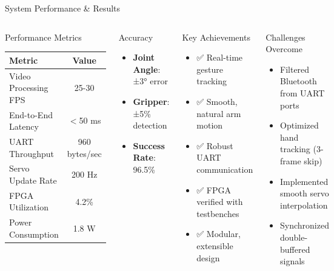 \documentclass[aspectratio=169]{beamer}
\begin{document}
\begin{frame}{System Performance \& Results}
\begin{columns}
\begin{block}{Performance Metrics}
\begin{table}
\tiny
\begin{tabular}{|l|c|}
\hline
\rowcolor{green!30}
\textbf{Metric} & \textbf{Value} \\
\hline
Video Processing FPS & 25-30 \\
\hline
End-to-End Latency & $<$50 ms \\
\hline
UART Throughput & 960 bytes/sec \\
\hline
Servo Update Rate & 200 Hz \\
\hline
FPGA Utilization & 4.2\% \\
\hline
Power Consumption & 1.8 W \\
\hline
\end{tabular}
\end{table}
\end{block}

\begin{block}{Accuracy}
\begin{itemize}
    \item \textbf{Joint Angle}: ±3° error
    \item \textbf{Gripper}: ±5\% detection
    \item \textbf{Success Rate}: 96.5\%
\end{itemize}
\end{block}

\begin{alertblock}{Key Achievements}
\begin{itemize}
    \item ✅ Real-time gesture tracking
    \item ✅ Smooth, natural arm motion
    \item ✅ Robust UART communication
    \item ✅ FPGA verified with testbenches
    \item ✅ Modular, extensible design
\end{itemize}
\end{alertblock}

\vspace{0.3cm}

\begin{exampleblock}{Challenges Overcome}
\begin{itemize}
    \item Filtered Bluetooth from UART ports
    \item Optimized hand tracking (3-frame skip)
    \item Implemented smooth servo interpolation
    \item Synchronized double-buffered signals
\end{itemize}
\end{exampleblock}
\end{columns}


\end{frame}
\end{document}
